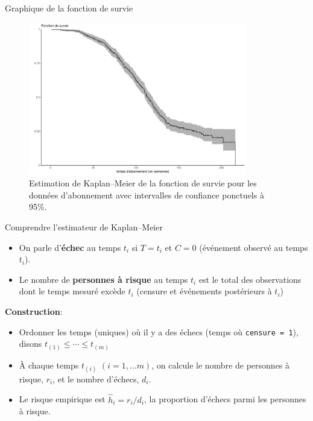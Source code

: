 \documentclass[
  ignorenonframetext,
]{beamer}
\providecommand{\tightlist}{%
  \setlength{\itemsep}{0pt}\setlength{\parskip}{0pt}}\usepackage{longtable,booktabs,array}
\begin{document}
\begin{frame}{Graphique de la fonction de survie}
\protect\hypertarget{graphique-de-la-fonction-de-survie}{}
\begin{figure}

{\centering \includegraphics[width=0.85\textwidth,height=\textheight]{MATH60602-diapos8_files/figure-beamer/fig-km-survie1-1.pdf}

}

\caption{\label{fig-km-survie1}Estimation de Kaplan--Meier de la
fonction de survie pour les données d'abonnement avec intervalles de
confiance ponctuels à 95\%.}

\end{figure}
\end{frame}

\begin{frame}[fragile]{Comprendre l'estimateur de Kaplan--Meier}
\protect\hypertarget{comprendre-lestimateur-de-kaplanmeier}{}
\begin{itemize}
\tightlist
\item
  On parle d'\textbf{échec} au temps \(t_i\) si \(T = t_i\) et \(C=0\)
  (événement observé au temps \(t_i\)).
\item
  Le nombre de \textbf{personnes à risque} au temps \(t_i\) est le total
  des observations dont le temps mesuré excède \(t_i\) (censure et
  événements postérieurs à \(t_i\))
\end{itemize}

\textbf{Construction}:

\begin{itemize}
\tightlist
\item
  Ordonner les temps (uniques) où il y a des échecs (temps où
  \texttt{censure\ =\ 1}), disons \(t_{(1)} \leq \cdots \leq t_{(m)}\)
\item
  À chaque temps \(t_{(i)}\) \((i=1, \ldots m)\), on calcule le nombre
  de personnes à risque, \(r_i\), et le nombre d'échecs, \(d_i\).
\item
  Le risque empirique est \(\widehat{h}_i = r_i/d_i\), la proportion
  d'échecs parmi les personnes à risque.
\end{itemize}
\end{frame}
\end{document}
